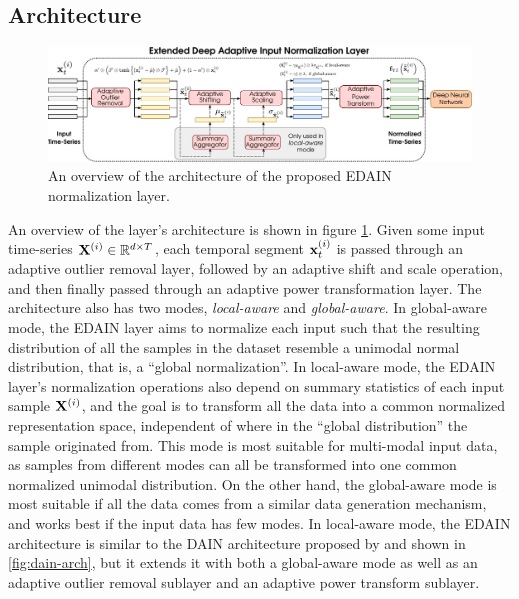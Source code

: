 \documentclass{statsmsc}
\begin{document}
{\subsection{Architecture}%
\label{sub:Architecture}

\begin{figure}
\begin{center}
    \includegraphics[width=\textwidth]{diagrams/edain-diagram.pdf}
\end{center}
\caption{An overview of the architecture of the proposed \ac{EDAIN} normalization layer.}
\label{fig:edain-arch}
\end{figure}

An overview of the layer's architecture is shown in figure \cref{fig:edain-arch}.
Given some input time-series $\mathbf{X}^{(i)} \in \mathbb{R}^{d \times T}$, each temporal segment
$\mathbf{x}^{(i)}_t$ is passed through an adaptive outlier removal layer, followed by an adaptive shift
and scale operation, and then finally passed through an adaptive power transformation layer.
The architecture also has two modes, \textit{local-aware} and \textit{global-aware}. In
global-aware mode, the \ac{EDAIN} layer aims to normalize each input such that the resulting
distribution of all the samples in the dataset resemble a unimodal normal distribution, that is,
a ``global normalization''. In local-aware mode,
the \ac{EDAIN} layer's normalization operations
also depend on summary statistics of each input sample $\mathbf{X}^{(i)}$, and the goal is to transform
all the data into a common normalized representation space, independent of where in the
``global distribution'' the sample originated from. This mode is most suitable for
multi-modal input data, as samples from different modes can all be transformed into one common
normalized unimodal distribution. On the other hand, the global-aware mode
is most suitable if all the data comes from a similar data generation mechanism,
and works best if the input data has few modes.
In local-aware mode, the \ac{EDAIN} architecture is similar to the
\ac{DAIN} architecture proposed by \citeauthor{dain} and shown
in \cref{fig:dain-arch}, but it
extends it with both a global-aware mode as well as an adaptive outlier removal sublayer and
an adaptive power transform sublayer.

}
\end{document}
